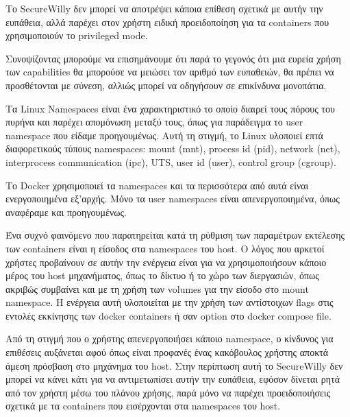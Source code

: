 \begin{description}[style=nextline]
Το \en SecureWilly\gr{} δεν μπορεί να αποτρέψει κάποια επίθεση σχετικά με αυτήν την ευπάθεια, αλλά παρέχει στον χρήστη ειδική προειδοποίηση για τα \en containers\gr{} που χρησιμοποιούν το \en privileged mode\gr{}.

Συνοψίζοντας μπορούμε να επισημάνουμε ότι παρά το γεγονός ότι μια ευρεία χρήση των \en capabilities\gr{} θα μπορούσε να μειώσει τον αριθμό των ευπαθειών, θα πρέπει να προσθέτονται με σύνεση, αλλιώς μπορεί να οδηγήσουν σε επικίνδυνα μονοπάτια.

\item[Απενεργοποίηση των \en namespaces\gr{}]
Τα \en Linux Namespaces\gr{} είναι ένα χαρακτηριστικό το οποίο διαιρεί τους πόρους του πυρήνα και παρέχει απομόνωση μεταξύ τους, όπως για παράδειγμα το \en user namespace\gr{} που είδαμε προηγουμένως. Αυτή τη στιγμή, το \en Linux\gr{} υλοποιεί επτά διαφορετικούς τύπους \en namespaces: mount (mnt), process id (pid), network (net), interprocess communication (ipc), UTS, user id (user), control group (cgroup).\gr{}

Το \en Docker\gr{} χρησιμοποιεί τα \en namespaces \gr{} και τα περισσότερα από αυτά είναι ενεργοποιημένα εξ'αρχής. Μόνο τα \en user namespaces\gr{} είναι απενεργοποιημένα, όπως αναφέραμε και προηγουμένως.

Ένα συχνό φαινόμενο που παρατηρείται κατά τη ρύθμιση των παραμέτρων εκτέλεσης των \en containers\gr{} είναι η είσοδος στα \en namespaces\gr{} του \en host\gr{}. Ο λόγος που αρκετοί χρήστες προβαίνουν σε αυτήν την ενέργεια είναι για να χρησιμοποιήσουν κάποιο μέρος του \en host\gr{} μηχανήματος, όπως το δίκτυο ή το χώρο των διεργασιών, όπως ακριβώς συμβαίνει και με τη χρήση των \en volumes\gr{} για την είσοδο στο \en mount namespace\gr{}. Η ενέργεια αυτή υλοποιείται με την χρήση των αντίστοιχων \en flags\gr{} στις εντολές εκκίνησης των \en docker containers\gr{} ή σαν \en option\gr{} στο \en docker compose file\gr{}.

Από τη στιγμή που ο χρήστης απενεργοποιήσει κάποιο \en namespace\gr{}, ο κίνδυνος για επιθέσεις αυξάνεται αφού όπως είναι προφανές ένας κακόβουλος χρήστης αποκτά άμεση πρόσβαση στο μηχάνημα του \en host\gr{}. Στην περίπτωση αυτή το \en SecureWilly\gr{} δεν μπορεί να κάνει κάτι για να αντιμετωπίσει αυτήν την ευπάθεια, εφόσον δίνεται ρητά από τον χρήστη μέσω του πλάνου χρήσης, παρά μόνο να παρέχει προειδοποιήσεις σχετικά με τα \en containers\gr{} που εισέρχονται στα \en namespaces\gr{} του \en host\gr{}.


\end{description}
